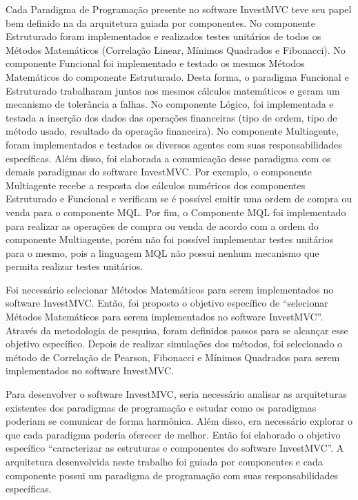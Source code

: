 Cada Paradigma de Programação presente no software InvestMVC teve seu papel bem definido na da arquitetura guiada por componentes. No componente Estruturado foram implementados e realizados testes unitários de todos os Métodos Matemáticos (Correlação Linear, Mínimos Quadrados e Fibonacci). No componente Funcional foi implementado e testado os mesmos Métodos Matemáticos do componente Estruturado. Desta forma, o paradigma Funcional e Estruturado trabalharam juntos nos mesmos cálculos matemáticos e geram um mecanismo de tolerância a falhas. No componente Lógico, foi implementada e testada a inserção dos dados das operações financeiras (tipo de ordem, tipo de método usado, resultado da operação financeira). No componente Multiagente, foram implementados e testados os diversos agentes com suas responsabilidades específicas. Além disso, foi elaborada a comunicação desse paradigma com os demais paradigmas do software InvestMVC. Por exemplo, o componente Multiagente recebe a resposta dos cálculos numéricos dos componentes Estruturado e Funcional e verificam se é possível emitir uma ordem de compra ou venda para o componente MQL. Por fim, o Componente MQL foi implementado para realizar as operações de compra ou venda de acordo com a ordem do componente Multiagente, porém não foi possível implementar testes unitários para o mesmo, pois a linguagem MQL não possui nenhum mecanismo que permita realizar testes unitários.

Foi necessário selecionar Métodos Matemáticos para serem implementados no software InvestMVC. Então, foi proposto o objetivo específico de “selecionar Métodos Matemáticos para serem implementados no software InvestMVC”. Através da metodologia de pesquisa, foram definidos passos para se alcançar esse objetivo específico. Depois de realizar simulações dos métodos, foi selecionado o método de Correlação de Pearson, Fibonacci e Mínimos Quadrados para serem implementados no software InvestMVC.

Para desenvolver o software InvestMVC, seria necessário analisar as arquiteturas existentes dos paradigmas de programação e estudar como os paradigmas poderiam se comunicar de forma harmônica. Além disso, era necessário explorar o que cada paradigma poderia oferecer de melhor. Então foi elaborado o objetivo específico “caracterizar as estruturas e componentes do software InvestMVC”. A arquitetura desenvolvida neste trabalho foi guiada por componentes e cada componente possui um paradigma de programação com suas responsabilidades específicas.


